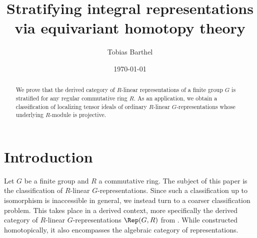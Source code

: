 \documentclass{amsart}%
\numberwithin{equation}{section}%
\theoremstyle{remark}
\begin{document}


\title[Integral stratification]{Stratifying integral representations \\ via equivariant homotopy theory}


\author{Tobias Barthel}

\date{\today}

\makeatletter
\patchcmd{\@setaddresses}{\indent}{\noindent}{}{}
\patchcmd{\@setaddresses}{\indent}{\noindent}{}{}
\patchcmd{\@setaddresses}{\indent}{\noindent}{}{}
\patchcmd{\@setaddresses}{\indent}{\noindent}{}{}
\makeatother

\address{Tobias Barthel, Max Planck Institute for Mathematics, Vivatsgasse 7, 53111 Bonn, Germany}

\begin{abstract}
We prove that the derived category of $R$-linear representations of a finite group $G$ is stratified for any regular commutative ring $R$. As an application, we obtain a classification of localizing tensor ideals of ordinary $R$-linear $G$-representations whose underlying $R$-module is projective.
\vspace{-3em}
\end{abstract}


\maketitle

\tableofcontents
\vspace{-3em}

\section{Introduction}

Let $G$ be a finite group and $R$ a commutative ring. The subject of this paper is the classification of $R$-linear $G$-representations. Since such a classification up to isomorphism is inaccessible in general, we instead turn to a coarser classification problem. This takes place in a derived context, more specifically the derived category of $R$-linear $G$-representations $\Rep(G,R)$ from \cite{barthel_integral1}. While constructed homotopically, it also encompasses the algebraic category of representations.
\end{document}
